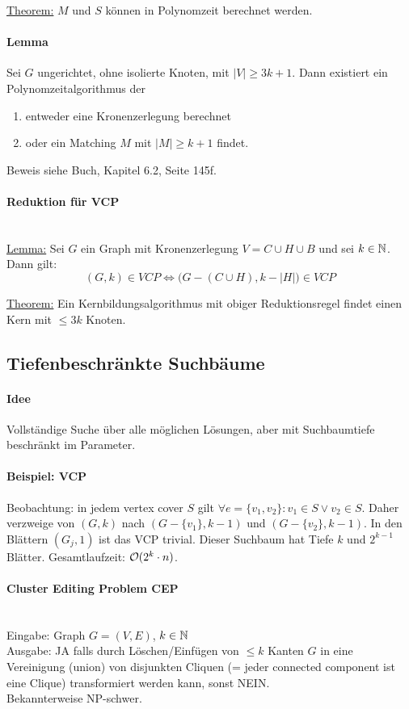 \underline{Theorem:}
$M$ und $S$ können in Polynomzeit berechnet werden.

\paragraph{Lemma}
Sei $G$ ungerichtet, ohne isolierte Knoten, mit $|V| \geq 3k+1$.
Dann existiert ein Polynomzeitalgorithmus der
\begin{enumerate}[label=(\roman*)]
    \item entweder eine Kronenzerlegung berechnet
    \item oder ein Matching $M$ mit $|M| \geq k+1$ findet.
\end{enumerate}
Beweis siehe Buch, Kapitel 6.2, Seite 145f.

\paragraph{Reduktion für VCP} \mbox{} \\
\underline{Lemma:}
Sei $G$ ein Graph mit Kronenzerlegung $V = C \cup H \cup B$ und sei $k \in \mathbb{N}$. Dann gilt: \\
$$ (G, k) \in VCP \iff \Big( G - (C \cup H), k - |H| \Big) \in VCP $$

\underline{Theorem:}
Ein Kernbildungsalgorithmus mit obiger Reduktionsregel findet einen Kern mit $\leq 3k$ Knoten.


\subsection{Tiefenbeschränkte Suchbäume}

\paragraph{Idee}
Vollständige Suche über alle möglichen Lösungen, aber mit Suchbaumtiefe beschränkt im Parameter.

\paragraph{Beispiel: VCP}
Beobachtung: in jedem vertex cover $S$ gilt $\forall e = \{v_1, v_2\} : v_1 \in S \vee v_2 \in S$.
Daher verzweige von $(G, k)$ nach $(G-\{v_1\}, k-1)$ und $(G-\{v_2\}, k-1)$.
In den Blättern $(G_j, 1)$ ist das VCP trivial.
Dieser Suchbaum hat Tiefe $k$ und $2^{k-1}$ Blätter.
Gesamtlaufzeit: $\mathcal{O} (2^k \cdot n)$.

\paragraph{Cluster Editing Problem CEP} \mbox{} \\
Eingabe: Graph $G = (V, E)$, $k \in \mathbb{N}$ \\
Ausgabe: JA falls durch Löschen/Einfügen von $\leq k$ Kanten $G$ in eine Vereinigung (union) von disjunkten Cliquen
(= jeder connected component ist eine Clique) transformiert werden kann, sonst NEIN. \\
Bekannterweise NP-schwer.

